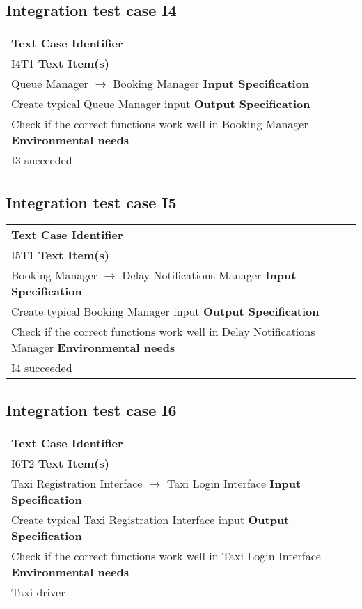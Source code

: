\subsection{Integration test case I4}
	\begin{tabular} {l p{9cm}}
		\hline \textbf{Text Case Identifier} & \\ I4T1
		\hline \textbf{Text Item(s)} & \\ Queue Manager $\rightarrow$ Booking Manager
		\hline \textbf{Input Specification} & \\ Create typical Queue Manager input
		\hline \textbf{Output Specification} & \\ Check if the correct functions work well in Booking Manager
		\hline \textbf{Environmental needs} & \\ I3 succeeded
		\hline 
	\end{tabular}
\subsection{Integration test case I5}
	\begin{tabular} {l p{9cm}}
		\hline \textbf{Text Case Identifier} & \\ I5T1
		\hline \textbf{Text Item(s)} & \\ Booking Manager $\rightarrow$ Delay Notifications Manager
		\hline \textbf{Input Specification} & \\ Create typical Booking Manager input
		\hline \textbf{Output Specification} & \\ Check if the correct functions work well in Delay Notifications Manager
		\hline \textbf{Environmental needs} & \\ I4 succeeded
		\hline 
	\end{tabular}
\subsection{Integration test case I6}
	\begin{tabular} {l p{9cm}}
		\hline \textbf{Text Case Identifier} & \\ I6T2
		\hline \textbf{Text Item(s)} & \\ Taxi Registration Interface $\rightarrow$ Taxi Login Interface
		\hline \textbf{Input Specification} & \\ Create typical Taxi Registration Interface input
		\hline \textbf{Output Specification} & \\ Check if the correct functions work well in Taxi Login Interface
		\hline \textbf{Environmental needs} & \\ Taxi driver
		\hline 
	\end{tabular}